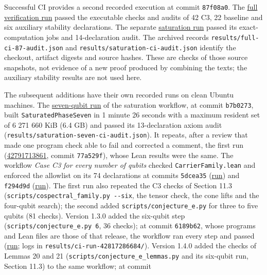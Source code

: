 \documentclass[11pt,a4paper]{article}
\begin{document}
Successful CI provides a second recorded execution at commit \texttt{87f08a0}. The
\href{https://github.com/0thernes/hoggar-bound-lab/actions/runs/42741638647}{full verification run}
passed the executable checks and audits of 42 C3, 22 baseline and six auxiliary stability
declarations. The separate
\href{https://github.com/0thernes/hoggar-bound-lab/actions/runs/42741638912}{saturation run}
passed its exact-computation jobs and 14-declaration audit. The archived records
\nolinkurl{results/full-ci-87-audit.json} and \nolinkurl{results/saturation-ci-audit.json} identify the checkout,
artifact digests and source hashes. These are checks of those source snapshots, not evidence of a
new proof produced by combining the texts; the auxiliary stability results are not used here.

The subsequent additions have their own recorded runs on clean Ubuntu machines. The
\href{https://github.com/0thernes/hoggar-bound-lab/actions/runs/42808984960}{seven-qubit run} of the
saturation workflow, at commit \texttt{b7b0273}, built \nolinkurl{SaturatedPhaseSeven} in 1 minute 26 seconds with a
maximum resident set of 6 271 660 KiB (6.4 GB) and passed its 13-declaration axiom audit
(\nolinkurl{results/saturation-seven-ci-audit.json}). It repeats, after a review that made one program check
able to fail and corrected a comment, the first run
(\href{https://github.com/0thernes/hoggar-bound-lab/actions/runs/42791713861}{42791713861}, commit
\texttt{77a529f}), whose Lean results were the same. The workflow \emph{Case C3 for every number of qubits} checked
\nolinkurl{CarrierFamily.lean} and enforced the allowlist on its 74 declarations at commits \texttt{5dcea35}
(\href{https://github.com/0thernes/hoggar-bound-lab/actions/runs/42797323071}{run}) and \texttt{f294d9d}
(\href{https://github.com/0thernes/hoggar-bound-lab/actions/runs/42801908151}{run}). The first run also
repeated the C3 checks of Section 11.3 (\texttt{scripts/cospectral\_family.py\ -\/-six}, the tensor check, the
cone lifts and the four-qubit search); the second added \nolinkurl{scripts/conjecture_e.py} for three to five
qubits (81 checks). Version 1.3.0 added the six-qubit step (\texttt{scripts/conjecture\_e.py\ 6}, 36 checks); at
commit \texttt{6189b62}, whose programs and Lean files are those of that release, the workflow ran every
step and passed (\href{https://github.com/0thernes/hoggar-bound-lab/actions/runs/42817286684}{run}; logs in
\nolinkurl{results/ci-run-42817286684/}). Version 1.4.0 added the checks of Lemmas 20 and 21
(\nolinkurl{scripts/conjecture_e_lemmas.py} and its six-qubit run, Section 11.3) to the same workflow; at commit
\end{document}

